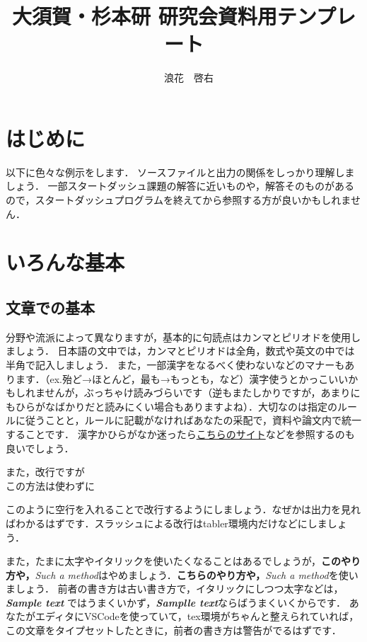 \documentclass[a4j]{jsarticle}
\title{大須賀・杉本研 研究会資料用テンプレート}
\author{
    　浪花　啓右
     }
\numberwithin{equation}{section}%
\begin{document}
\maketitle
\thispagestyle{empty}
%
\section{はじめに}
以下に色々な例示をします．
ソースファイルと出力の関係をしっかり理解しましょう．
一部スタートダッシュ課題の解答に近いものや，解答そのものがあるので，スタートダッシュプログラムを終えてから参照する方が良いかもしれません．

\section{いろんな基本}

\subsection{文章での基本}
分野や流派によって異なりますが，基本的に句読点はカンマとピリオドを使用しましょう．
日本語の文中では，カンマとピリオドは全角，数式や英文の中では半角で記入しましょう．
また，一部漢字をなるべく使わないなどのマナーもあります．（ex.殆ど→ほとんど，最も→もっとも，など）漢字使うとかっこいいかもしれませんが，ぶっちゃけ読みづらいです（逆もまたしかりですが，あまりにもひらがなばかりだと読みにくい場合もありますよね）．大切なのは指定のルールに従うことと，ルールに記載がなければあなたの采配で，資料や論文内で統一することです．
漢字かひらがなか迷ったら\href{http://www.yamanouchi-yri.com/yrihp/techwrt-2-4s/t-2-4s03a.htm}{こちらのサイト}などを参照するのも良いでしょう．


また，改行ですが\\
この方法は使わずに

このように空行を入れることで改行するようにしましょう．なぜかは出力を見ればわかるはずです．スラッシュによる改行はtabler環境内だけなどにしましょう．

また，たまに太字やイタリックを使いたくなることはあるでしょうが，{\bf このやり方や，}{\it Such a method}はやめましょう．\textbf{こちらのやり方や，}\textit{Such a method}を使いましょう．
前者の書き方は古い書き方で，イタリックにしつつ太字などは，{\bf {\it Sample text} }ではうまくいかず，\textbf{\textit{Samplle text}}ならばうまくいくからです．
あなたがエディタにVSCodeを使っていて，tex環境がちゃんと整えられていれば，この文章をタイプセットしたときに，前者の書き方は警告がでるはずです．
\end{document}
